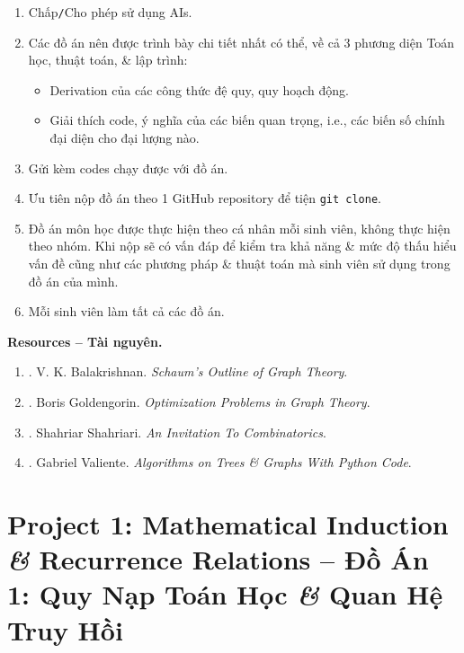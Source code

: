 \documentclass{article}
\begin{document}
\begin{enumerate}
    \item Chấp{\tt/}Cho phép sử dụng AIs.
    \item Các đồ án nên được trình bày chi tiết nhất có thể, về cả 3 phương diện Toán học, thuật toán, \& lập trình:
    \begin{itemize}
        \item Derivation của các công thức đệ quy, quy hoạch động.
        \item Giải thích code, ý nghĩa của các biến quan trọng, i.e., các biến số chính đại diện cho đại lượng nào.
    \end{itemize}
    \item Gửi kèm codes chạy được với đồ án.
    \item Ưu tiên nộp đồ án theo 1 GitHub repository để tiện {\tt git clone}.
    \item Đồ án môn học được thực hiện theo cá nhân mỗi sinh viên, không thực hiện theo nhóm. Khi nộp sẽ có vấn đáp để kiểm tra khả năng \& mức độ thấu hiểu vấn đề cũng như các phương pháp \& thuật toán mà sinh viên sử dụng trong đồ án của mình.
    \item Mỗi sinh viên làm tất cả các đồ án.
\end{enumerate}
\textbf{\textsf{Resources -- Tài nguyên.}}
\begin{enumerate}
    \item \cite{Balakrishnan1997}. {\sc V. K. Balakrishnan}. {\it Schaum's Outline of Graph Theory}.
    
    \item \cite{Goldengorin2018}. {\sc Boris Goldengorin}. {\it Optimization Problems in Graph Theory}.
    
    \item \cite{Shahriari2022}. {\sc Shahriar Shahriari}. {\it An Invitation To Combinatorics}.
    
    \item \cite{Valiente2002, Valiente2021}. {\sc Gabriel Valiente}. {\it Algorithms on Trees \& Graphs With Python Code}.
\end{enumerate}


\section{Project 1: Mathematical Induction {\it\&} Recurrence Relations -- Đồ Án 1: Quy Nạp Toán Học {\it\&} Quan Hệ Truy Hồi}
\end{document}
